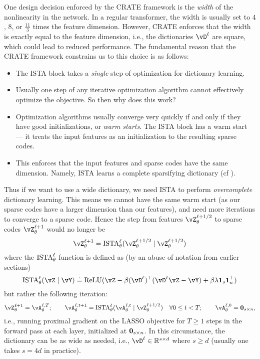 \documentclass[../../book-main.tex]{subfiles}
\begin{document}
One design decision enforced by the CRATE framework is the \textit{width} of the nonlinearity in the network. In a regular transformer, the width is usually set to \(4\), \(8\), or \(\frac{11}{3}\) times the feature dimension. However, CRATE enforces that the width is exactly equal to the feature dimension, i.e., the dictionaries \(\vD^{\ell}\) are square, which could lead to reduced performance. The fundamental reason that the CRATE framework constrains us to this choice is as follows:
\begin{itemize}
    \item The ISTA block takes a \textit{single} step of optimization for dictionary learning.
    \item Usually one step of any iterative optimization algorithm cannot effectively optimize the objective. So then why does this work?
    \item Optimization algorithms usually converge very quickly if and only if they have good initializations, or \textit{warm starts}. The ISTA block has a warm start --- it treats the input features as an initialization to the resulting sparse codes.
    \item This enforces that the input features and sparse codes have the same dimension. Namely, ISTA learns a complete sparsifying dictionary (cf ).
\end{itemize}
Thus if we want to use a wide dictionary, we need ISTA to perform \textit{overcomplete} dictionary learning. This means we cannot have the same warm start (as our sparse codes have a larger dimension than our features), and need more iterations to converge to a sparse code. Hence the step from features \(\vZ_{\theta}^{\ell + 1/2}\) to sparse codes \(\vZ_{\theta}^{\ell + 1}\) would no longer be 
\begin{equation}
    \vZ_{\theta}^{\ell + 1} = \ISTA_{\theta}^{\ell}(\vZ_{\theta}^{\ell + 1/2} \mid \vZ_{\theta}^{\ell + 1/2})
\end{equation}
where the \(\operatorname{ISTA}_{\theta}^{\ell}\) function is defined as (by an abuse of notation from earlier sections)
\begin{equation}
    \ISTA_{\theta}^{\ell}(\vZ \mid \vY) \doteq \ReLU(\vZ - \beta (\vD^{\ell})^{\top}(\vD^{\ell}\vZ - \vY) + \beta \lambda \vone_{s}\vone_{n}^{\top})
\end{equation}
but rather the following iteration:
\begin{equation}
    \vZ_{\theta}^{\ell + 1} = \vA_{\theta}^{\ell, T}; \qquad \vA_{\theta}^{\ell, t + 1} = \ISTA_{\theta}^{\ell}(\vA_{\theta}^{\ell, t} \mid \vZ_{\theta}^{\ell + 1/2}) \quad \forall 0 \leq t < T; \qquad \vA_{\theta}^{\ell, 0} = \vzero_{s \times n},
\end{equation}
i.e., running proximal gradient on the LASSO objective for \(T \geq 1\) steps in the forward pass at each layer, initialized at \(\bm{0}_{s \times n}\). In this circumstance, the dictionary can be as wide as needed, i.e., \(\vD^{\ell} \in \R^{s \times d}\) where \(s \geq d\) (usually one takes \(s = 4d\) in practice). 
\end{document}
